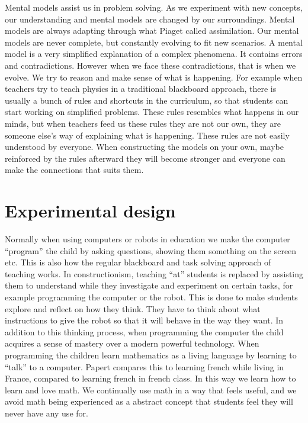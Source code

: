 \bigskip\noindent
Mental models assist us in problem solving. As we experiment with new concepts, our understanding and mental models are changed by our surroundings. Mental models are always adapting through what Piaget called assimilation. Our mental models are never complete, but constantly evolving to fit new scenarios. A mental model is a very simplified explanation of a complex phenomena. It contains errors and contradictions. However when we face these contradictions, that is when we evolve. We try to reason and make sense of what is happening. For example when teachers try to teach physics in a traditional blackboard approach, there is usually a bunch of rules and shortcuts in the curriculum, so that students can start working on simplified problems. These rules resembles what happens in our minds, but when teachers feed us these rules they are not our own, they are someone else's way of explaining what is happening. These rules are not easily understood by everyone. When constructing the models on your own, maybe reinforced by the rules afterward they will become stronger and everyone can make the connections that suits them. 

\section{Experimental design}
Normally when using computers or robots in education we make the computer ``program'' the child by asking questions, showing them something on the screen etc. This is also how the regular blackboard and task solving approach of teaching works. In constructionism, teaching ``at'' students is replaced by assisting them to understand while they investigate and experiment on certain tasks, for example programming the computer or the robot. This is done to make students explore and reflect on how they think. They have to think about what instructions to give the robot so that it will behave in the way they want. In addition to this thinking process, when programming the computer the child acquires a sense of mastery over a modern powerful technology. When programming the children learn mathematics as a living language by learning to ``talk'' to a computer. Papert compares this to learning french while living in France, compared to learning french in french class. In this way we learn how to learn and love math. We continually use math in a way that feels useful, and we avoid math being experienced as a abstract concept that students feel they will never have any use for. 

